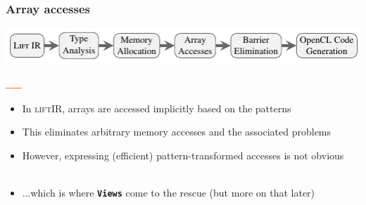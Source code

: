 \documentclass[10pt,usetotalslideindicator]{beamer}
\newcommand{\lift}{\textsc{lift}\space}
\newcommand{\code}[1]{\textbf{\texttt{#1}}}
\begin{document}
\begin{frame}[t]
\frametitle{Array accesses}
    \vspace{-1cm}
    \begin{block}{}
        \begin{center}
            \includegraphics[width=1\textwidth]{../images/compilation_stages.pdf}
        \end{center}
        \vspace{-1.05cm}
        \hspace{5.2cm}
        \includegraphics[width=.95cm, height=0.03cm]{../images/orange_bar.png}
        \vspace{.45cm}
    \end{block}
    \vspace{-0.5cm}
\begin{itemize}
	\item In \lift IR, arrays are accessed implicitly based on the patterns
	\item This eliminates arbitrary memory accesses and the associated problems
	\item However, expressing (efficient) pattern-transformed accesses is not obvious\\
	\ 
	\item ...which is where \code{Views} come to the rescue (but more on that later)
\end{itemize}
\end{frame}
\end{document}
